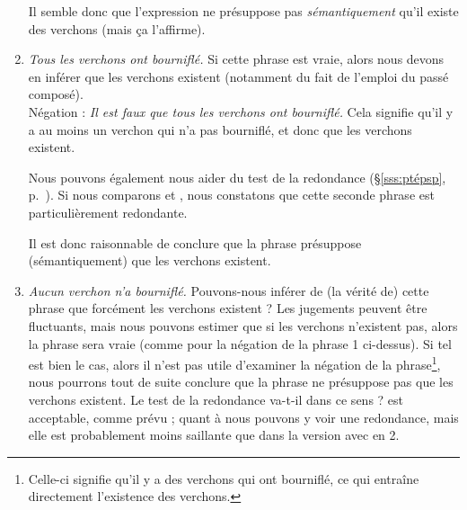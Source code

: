 \begin{exo}
\begin{solu}
\begin{enumerate}
Il semble donc que l'expression  ne présuppose pas \emph{sémantiquement} qu'il existe des verchons (mais ça l'affirme).

\item \emph{Tous les verchons ont bourniflé.}  Si cette phrase est vraie, alors nous devons en inférer que les verchons existent (notamment du fait de l'emploi du passé composé).\\
Négation : \emph{Il est faux que tous les verchons ont bourniflé.} Cela signifie qu'il y a au moins un verchon qui n'a pas bourniflé, et donc que les verchons existent. 

Nous pouvons également nous aider du test de la redondance (\S\ref{sss:ptépsp}, p.~\pageref{p.testAB}).  Si nous comparons  et , nous constatons que cette seconde phrase est particulièrement redondante.

Il est donc raisonnable de conclure que la phrase présuppose (sémantiquement) que les verchons existent.

\item \emph{Aucun verchon n'a bourniflé.}  Pouvons-nous inférer de (la vérité de) cette phrase que forcément les verchons existent ? Les jugements peuvent être fluctuants, mais nous pouvons estimer que si les verchons n'existent pas, alors la phrase sera vraie (comme pour la négation de la phrase 1 ci-dessus). Si tel est bien le cas, alors il n'est pas utile d'examiner la négation de la phrase\footnote{Celle-ci signifie qu'il y a des verchons qui ont bourniflé, ce qui entraîne directement l'existence des verchons.}, nous pourrons tout de suite conclure que la phrase ne présuppose pas que les verchons existent. Le test de la redondance va-t-il dans ce sens ?  est acceptable, comme prévu ; quant à  nous pouvons y voir une redondance, mais elle est probablement moins saillante que dans la version avec  en 2. 
\end{enumerate}
\end{solu}
\end{exo}
